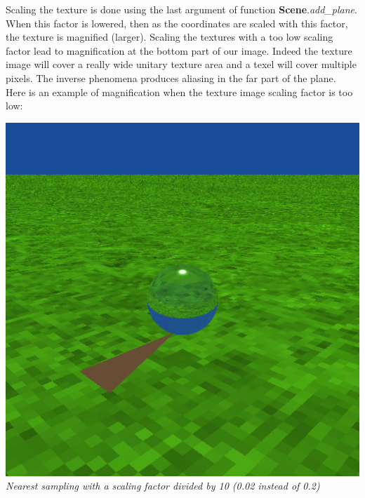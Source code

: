 \documentclass[a4,12pt]{article}
\begin{document}
	Scaling the texture is done using the last argument of function \textbf{Scene}.\textit{add\_plane}. When this factor is lowered, then as the coordinates are scaled with this factor, the texture is magnified (larger).
	Scaling the textures with a too low scaling factor lead to magnification at the bottom part of our image. Indeed the texture image will cover a really wide unitary texture area and a texel will cover multiple pixels. The inverse phenomena produces aliasing in the far part of the plane.\\
	
	Here is an example of magnification when the texture image scaling factor is too low:
	
	\begin{center}
		\begin{minipage}[b]{0.40\linewidth}
			\begin{center}
				\includegraphics[width = \textwidth]{./Worksheet3/MagnifRenduNearest.png}\\
				\textit{Nearest sampling with a scaling factor divided by 10 (0.02 instead of 0.2)\\\vspace{1em}}
			\end{center}
		\end{minipage}
		\hspace{0.05\linewidth}

\end{center}
\end{document}

